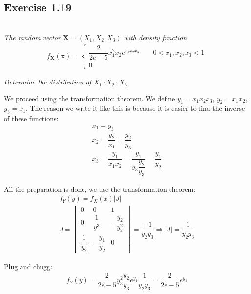 \subsection{Exercise 1.19}\hfill\\
\textit{The random vector $\mathbf{X} = (X_1,X_2,X_3)$ with density function}
\begin{equation*}
  \begin{gathered}
    f_{\mathbf{X}}(\mathbf{x}) = 
    \begin{cases*}
      \dfrac{2}{2e-5}x_1^2x_2e^{x_1x_2x_3}\qquad 0<x_1, x_2,x_3<1\\
      0
    \end{cases*}
  \end{gathered}
\end{equation*}\par
\textit{Determine the distribution of $X_1\cdot X_2\cdot X_3$}
\par\bigskip
\noindent We proceed using the transformation theorem. We define $y_1 = x_1x_2x_3$, $y_2 = x_1x_2$, $y_3 = x_1$. The reason we write it like this is because it is easier to find the inverse of these functions:
\begin{equation*}
  \begin{gathered}
    x_1 = y_3\\
    x_2 = \dfrac{y_2}{x_1} = \dfrac{y_2}{y_3}\\
    x_3 = \dfrac{y_1}{x_1x_2} = \dfrac{y_1}{y_3\dfrac{y_2}{y_3}} = \dfrac{y_1}{y_2}
  \end{gathered}
\end{equation*}\par
\noindent All the preparation is done, we use the transformation theorem:
\begin{equation*}
  \begin{gathered}
    f_Y(y) = f_X(x)\left|J\right|\\
    J = \begin{vmatrix}0&0&1\\0&\dfrac{1}{y^3}&-\dfrac{y_2}{y_3^2}\\\dfrac{1}{y_2}&-\dfrac{y_1}{y_2}&0\end{vmatrix} = \dfrac{-1}{y_2y_3}\Rightarrow \left|J\right| = \dfrac{1}{y_2y_3}
  \end{gathered}
\end{equation*}\par
\noindent Plug and chugg:
\begin{equation*}
  \begin{gathered}
    f_Y(y) = \dfrac{2}{2e-5}y_3^2\dfrac{y_2}{y_3}e^{y_1}\dfrac{1}{y_2y_3} = \dfrac{2}{2e-5}e^{y_1}
  \end{gathered}
\end{equation*}
